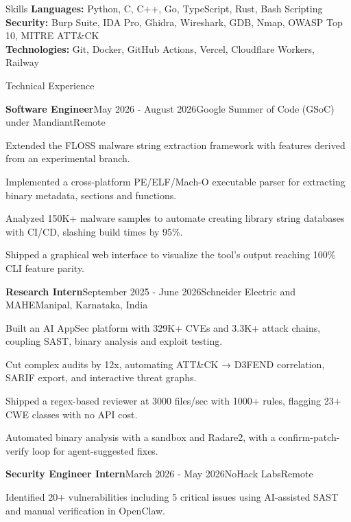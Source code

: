 \documentclass{resume}
\begin{document}
\vspace{-1.1em}
\begin{rSection}{Skills}
\textbf{Languages:} Python, C, C++, Go, TypeScript, Rust, Bash Scripting  \\
\textbf{Security:} Burp Suite, IDA Pro, Ghidra, Wireshark, GDB, Nmap, OWASP Top 10, MITRE ATT\&CK \\
\textbf{Technologies:} Git, Docker, GitHub Actions, Vercel, Cloudflare Workers, Railway
\end{rSection}

\vspace{-0.5em}
\begin{rSection}{Technical Experience}

\begin{rSubsection}{\bf Software Engineer}{May 2026 - August 2026}{Google Summer of Code (GSoC) under Mandiant}{Remote}
\item Extended the FLOSS malware string extraction framework with features derived from an experimental branch.
\item Implemented a cross-platform PE/ELF/Mach-O executable parser for extracting binary metadata, sections and functions.
\item Analyzed 150K+ malware samples to automate creating library string databases with CI/CD, slashing build times by 95\%.
\item Shipped a graphical web interface to visualize the tool's output reaching 100\% CLI feature parity.
\end{rSubsection}
\begin{rSubsection}{\bf Research Intern}{September 2025 - June 2026}{Schneider Electric and MAHE}{Manipal, Karnataka, India}
\item Built an AI AppSec platform with 329K+ CVEs and 3.3K+ attack chains, coupling SAST, binary analysis and exploit testing.
\item Cut complex audits by 12x, automating ATT\&CK → D3FEND correlation, SARIF export, and interactive threat graphs.
\item Shipped a regex-based reviewer at 3000 files/sec with 1000+ rules, flagging 23+ CWE classes with no API cost.
\item Automated binary analysis with a sandbox and Radare2, with a confirm-patch-verify loop for agent-suggested fixes.
\end{rSubsection}
\begin{rSubsection}{\bf Security Engineer Intern}{March 2026 - May 2026}{NoHack Labs}{Remote}
\item Identified 20+ vulnerabilities including 5 critical issues using AI-assisted SAST and manual verification in OpenClaw.

\end{rSubsection}
\end{rSection}
\end{document}
